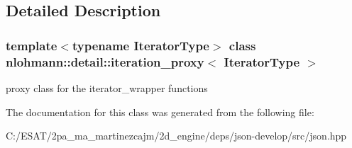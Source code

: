 \subsection{Detailed Description}
\subsubsection*{template$<$typename Iterator\+Type$>$\newline
class nlohmann\+::detail\+::iteration\+\_\+proxy$<$ Iterator\+Type $>$}

proxy class for the iterator\+\_\+wrapper functions 

The documentation for this class was generated from the following file\+:\begin{DoxyCompactItemize}
\item 
C\+:/\+E\+S\+A\+T/2pa\+\_\+ma\+\_\+martinezcajm/2d\+\_\+engine/deps/json-\/develop/src/json.\+hpp\end{DoxyCompactItemize}
